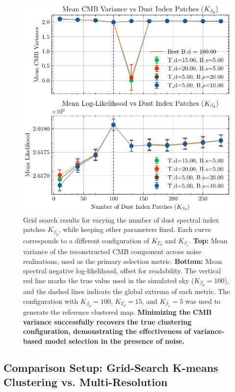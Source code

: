 \documentclass[%
 reprint,
bibnotes,
 amsmath,amssymb,
 aps,
floatfix, 
]{revtex4-2}
\begin{document}
\begin{figure}[h]
    \centering
    \includegraphics[width=\linewidth]{figures/validation_likelihood_vs_variance.pdf}
    \caption{
        Grid search results for varying the number of dust spectral index patches \( K_{\beta_d} \), while keeping other parameters fixed.
        Each curve corresponds to a different configuration of \( K_{T_d} \) and \( K_{\beta_s} \).
        \textbf{Top:} Mean variance of the reconstructed CMB component across noise realizations, used as the primary selection metric.
        \textbf{Bottom:} Mean spectral negative log-likelihood, offset for readability.
        The vertical red line marks the true value used in the simulated sky (\( K_{\beta_d} = 100 \)), and the dashed lines indicate the global extrema of each metric.
        The configuration with \( K_{\beta_d} = 100 \), \( K_{T_d} = 15 \), and \( K_{\beta_s} = 5 \) was used to generate the reference clustered map.
        \textbf{Minimizing the CMB variance successfully recovers the true clustering configuration, demonstrating the effectiveness of variance-based model selection in the presence of noise.}
    }
    \label{fig:grid_search_summary}
\end{figure}

\subsection{Comparison Setup: Grid-Search K-means Clustering vs. Multi-Resolution}
\label{subsec:comparison_setup}
\end{document}
